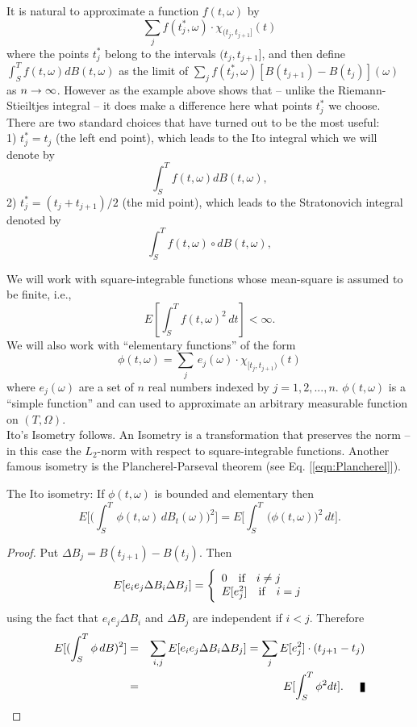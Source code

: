 It is natural to approximate a function $f(t,\omega)$ by $$\sum_jf(t^*_j,\omega)\cdot \chi_{(t_j,t_{j+1}]}(t)$$ where the points $t^*_j$ belong to the intervals $(t_j, t_{j+1}]$, and then define $\int_S^T f(t,\omega) dB(t,\omega)$ as the limit of $\sum_j f(t^*_j, \omega)[B(t_{j+1}) - B(t_j)](\omega)$ as $n\rightarrow\infty$. However as the example above shows that -- unlike the Riemann-Stieiltjes integral -- it does make a difference here what points $t^*_j$ we choose.\\

There are two standard choices that have turned out to be the most useful:\\

1) $t^*_j = t_j$ (the left end point), which leads to the {\elevenit Ito integral} which we will denote by $$\int_S^T f(t,\omega) dB(t,\omega),$$
2) $t^*_j = (t_j + t_{j+1})/2$ (the mid point), which leads to the {\elevenit Stratonovich integral} denoted by 
$$\int_S^T f(t,\omega) \circ dB(t,\omega),$$

We will work with square-integrable functions whose mean-square is assumed to be finite, i.e., $$E[\int_S^T f(t,\omega)^2\,dt] < \infty.$$ We will also work with ``elementary functions'' of the form $$ \phi(t,\omega) = \sum_j\,e_j(\omega) \cdot \chi_{[t_j, t_{j+1})}(t) $$ where $e_j(\omega)$ are a set of $n$ real numbers indexed by $j = 1, 2, ..., n$. $\phi(t,\omega)$ is a ``simple function'' and can used to approximate an arbitrary measurable function on $(T,\Omega)$.\\

Ito's Isometry follows. An {\elevenit Isometry}\/ is a transformation that preserves the norm -- in this case the $L_2$-norm with respect to square-integrable functions. Another famous isometry is the Plancherel-Parseval theorem (see Eq. [\ref{eqn:Plancherel}]).

\begin{lemma}{The Ito isometry:}
If $\phi(t,\omega)$ is bounded and elementary then 
$$E\Big[\Big( \int_S^T\, \phi(t,\omega)\, dB_t(\omega)\Big)^2\Big] = E\Big[\int_S^T\, \big(\phi(t,\omega)\big)^2 \, dt\Big].$$ 
\end{lemma}

\begin{proof}
Put $\Delta B_j = B(t_{j+1}) - B(t_j)$. Then 
$$E[e_ie_j \Delta B_i \Delta B_j] = \Bigg\{
\begin{array}{l}
0 \quad \hbox{if} \quad i\neq j \\
E[e_j^2] \quad \hbox{if} \quad i=j \\
\end{array}$$ using the fact that $e_i e_j\Delta B_i$ and $\Delta B_j$ are independent if $i<j$.
Therefore 
\begin{eqnarray*}
E[(\int_S^T \phi\, dB)^2] &=& \sum_{i,j} E[e_ie_j\Delta B_i\Delta B_j] = \sum_{j} E[e_j^2]\cdot (t_{j+1} - t_j) \\
&=& E[\int_S^T \phi^2 dt].\qed
\end{eqnarray*}
\end{proof}

